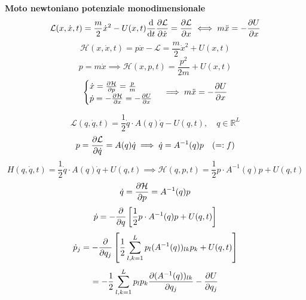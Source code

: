 \begin{example}
    \textbf{Moto newtoniano potenziale monodimensionale} 
    \begin{equation}
        \mathcal{L}(x,\dot{x},t)= \frac{m}{2}\dot{x}^2 - U(x,t)
        \dv{t}\pdv{\mathcal{L}}{\dot{x}}= \pdv{\mathcal{L}}{x} 
        \iff m\ddot{x}= -\pdv{U}{x}
    \end{equation}
    \begin{equation}
        \mathcal{H}(x,\dot{x},t)= p\dot{x}-\mathcal{L}= \frac{m}{2}\dot{x}^2+ U(x,t)
    \end{equation}
    \begin{equation}
        p=m\dot{x} \implies \mathcal{H}(x,p,t)= \frac{p^2}{2m}+ U(x,t)
    \end{equation}
    \begin{equation}
        \begin{cases}
            \dot{x}= \pdv{\mathcal{H}}{p}= \frac{p}{m}\\
            \dot{p}= -\pdv{\mathcal{H}}{x}= -\pdv{U}{x}
        \end{cases}
        \implies m\ddot{x}= -\pdv{U}{x}
    \end{equation}
\end{example}\begin{example}
    \begin{equation}
        \mathcal{L}(q,\dot{q},t)= \frac{1}{2}\dot{q}\cdot A(q)\dot{q}-U(q,t), 
        \quad q\in\mathbb{R}^L
    \end{equation}
    \begin{equation}
        p= \pdv{\mathcal{L}}{\dot{q}}= A(q)\dot{q} 
        \implies \dot{q}= A^{-1}(q)p \quad (=:f)
    \end{equation}
    \begin{equation}
        H(q,\dot{q},t)= \frac{1}{2}\dot{q}\cdot A(q)\dot{q}+ U(q,t) 
        \implies \mathcal{H}(q,p,t)= \frac{1}{2}p\cdot A^{-1}(q)p+ U(q,t)
    \end{equation}
    \begin{equation}
        \dot{q}= \pdv{\mathcal{H}}{p}= A^{-1}(q)p
    \end{equation}
    \begin{equation}
        \dot{p}= -\pdv{q}\left[\frac{1}{2}p\cdot A^{-1}(q)p+ U(q,t)\right]
    \end{equation}
    \begin{equation}
        \dot{p}_j= -\pdv{q_j}\left[\frac{1}{2}\sum_{l,k=1}^L p_l (A^{-1}(q))_{lk}p_k+ U(q,t)\right]
    \end{equation}
    \begin{equation*}
        = -\frac{1}{2}\sum_{l,k=1}^L p_l p_k \pdv{(A^{-1}(q))_{lk}}{q_j} - \pdv{U}{q_j}(q,t)
    \end{equation*}
\end{example}
